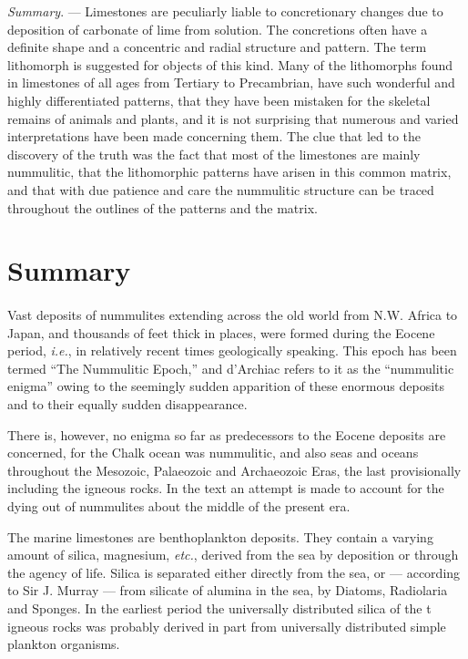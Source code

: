 \documentclass[a4paper, 12pt, oneside]{article}
\begin{document}
\emph{Summary}. --- Limestones are peculiarly liable to concretionary changes due to deposition of carbonate of lime from solution. The concretions often have a definite shape and a concentric and radial structure and pattern. The term lithomorph is suggested for objects of this kind. Many of the lithomorphs found in limestones of all ages from Tertiary to Precambrian, have such wonderful and highly differentiated patterns, that they have been mistaken for the skeletal remains of animals and plants, and it is not surprising that numerous and varied interpretations have been made concerning them. The clue that led to the discovery of the truth was the fact that most of the limestones are mainly nummulitic, that the lithomorphic patterns have arisen in this common matrix, and that with due patience and care the nummulitic structure can be traced throughout the outlines of the patterns and the matrix.
\clearpage
\section{Summary}
\paragraph{}
Vast deposits of nummulites extending across the old world from N.W. Africa to Japan, and thousands of feet thick in places, were formed during the Eocene period, \emph{i.e.}, in relatively recent times geologically speaking. This epoch has been termed ``The Nummulitic Epoch,'' and d'Archiac refers to it as the ``nummulitic enigma'' owing to the seemingly sudden apparition of these enormous deposits and to their equally sudden disappearance.

There is, however, no enigma so far as predecessors to the Eocene deposits are concerned, for the Chalk ocean was nummulitic, and also seas and oceans throughout the Mesozoic, Palaeozoic and Archaeozoic Eras, the last provisionally including the igneous rocks. In the text an attempt is made to account for the dying out of nummulites about the middle of the present era.

The marine limestones are benthoplankton deposits. They contain a varying amount of silica, magnesium, \emph{etc.}, derived from the sea by deposition or through the agency of life. Silica is separated either directly from the sea, or --- according to Sir J. Murray --- from silicate of alumina in the sea, by Diatoms, Radiolaria and Sponges. In the earliest period the universally distributed silica of the t igneous rocks was probably derived in part from universally distributed simple plankton organisms.
\end{document}
